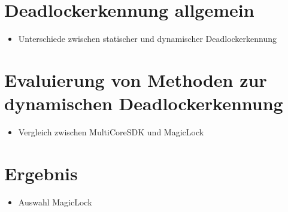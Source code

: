 \section{Deadlockerkennung allgemein}
\begin{itemize}
  \item Unterschiede zwischen statischer und dynamischer Deadlockerkennung
\end{itemize}

\section{Evaluierung von Methoden zur dynamischen Deadlockerkennung}
\begin{itemize}
  \item Vergleich zwischen MultiCoreSDK und MagicLock
\end{itemize}

\section{Ergebnis}\label{Ergebnis}
\begin{itemize}
  \item Auswahl MagicLock\cite{MagicLock}
\end{itemize}